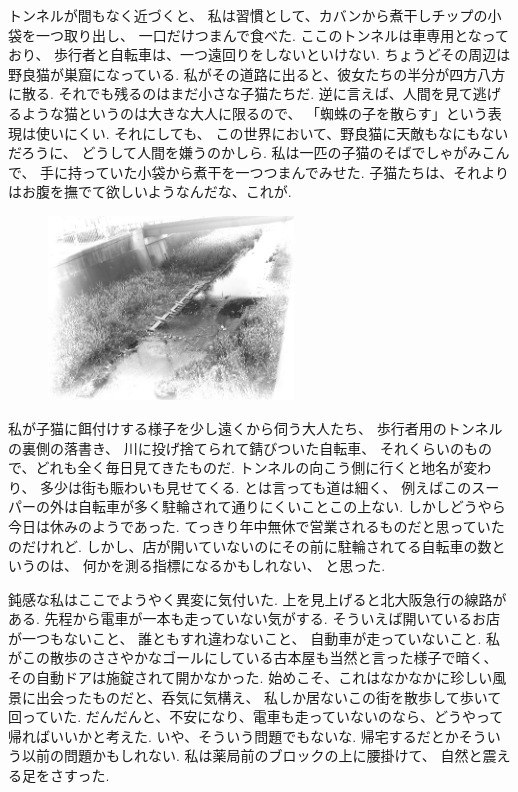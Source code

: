 
トンネルが間もなく近づくと、
私は習慣として、カバンから煮干しチップの小袋を一つ取り出し、
一口だけつまんで食べた.
ここのトンネルは車専用となっており、
歩行者と自転車は、一つ遠回りをしないといけない.
ちょうどその周辺は野良猫が巣窟になっている.
私がその道路に出ると、彼女たちの半分が四方八方に散る.
それでも残るのはまだ小さな子猫たちだ.
逆に言えば、人間を見て逃げるような猫というのは大きな大人に限るので、
「蜘蛛の子を散らす」という表現は使いにくい.
それにしても、
この世界において、野良猫に天敵もなにもないだろうに、
どうして人間を嫌うのかしら.
私は一匹の子猫のそばでしゃがみこんで、
手に持っていた小袋から煮干を一つつまんでみせた.
子猫たちは、それよりはお腹を撫でて欲しいようなんだな、これが.

\begin{figure}
  \includegraphics[width=0.58\textwidth,bb=0 0 1600 1200]{img/river.jpg}
\end{figure}

私が子猫に餌付けする様子を少し遠くから伺う大人たち、
歩行者用のトンネルの裏側の落書き、
川に投げ捨てられて錆びついた自転車、
それくらいのもので、どれも全く毎日見てきたものだ.
トンネルの向こう側に行くと地名が変わり、
多少は街も賑わいも見せてくる.
とは言っても道は細く、
例えばこのスーパーの外は自転車が多く駐輪されて通りにくいことこの上ない.
しかしどうやら今日は休みのようであった.
てっきり年中無休で営業されるものだと思っていたのだけれど.
しかし、店が開いていないのにその前に駐輪されてる自転車の数というのは、
何かを測る指標になるかもしれない、
と思った.

鈍感な私はここでようやく異変に気付いた.
上を見上げると北大阪急行の線路がある.
先程から電車が一本も走っていない気がする.
そういえば開いているお店が一つもないこと、
誰ともすれ違わないこと、
自動車が走っていないこと.
私がこの散歩のささやかなゴールにしている古本屋も当然と言った様子で暗く、
その自動ドアは施錠されて開かなかった.
始めこそ、これはなかなかに珍しい風景に出会ったものだと、呑気に気構え、
私しか居ないこの街を散歩して歩いて回っていた.
だんだんと、不安になり、電車も走っていないのなら、どうやって帰ればいいかと考えた.
いや、そういう問題でもないな.
帰宅するだとかそういう以前の問題かもしれない.
私は薬局前のブロックの上に腰掛けて、
自然と震える足をさすった.

